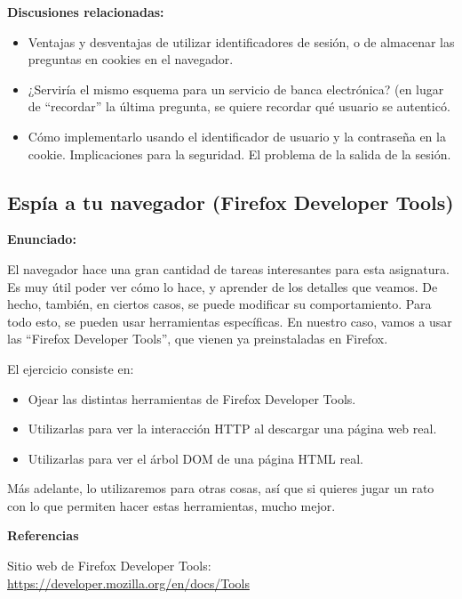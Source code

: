 \textbf{Discusiones relacionadas:}

\begin{itemize}
\item Ventajas y desventajas de utilizar identificadores de sesión, o de almacenar las preguntas en cookies en el navegador.
\item ¿Serviría el mismo esquema para un servicio de banca electrónica? (en lugar de ``recordar'' la última pregunta, se quiere recordar qué usuario se autenticó.
\item Cómo implementarlo usando el identificador de usuario y la contraseña en la cookie. Implicaciones para la seguridad. El problema de la salida de la sesión.
\end{itemize}

\subsection{Espía a tu navegador (Firefox Developer Tools)}
\label{subsec:firefox-devel}

\textbf{Enunciado:}

El navegador hace una gran cantidad de tareas interesantes para esta asignatura. Es muy útil poder ver cómo lo hace, y aprender de los detalles que veamos. De hecho, también, en ciertos casos, se puede modificar su comportamiento. Para todo esto, se pueden usar herramientas específicas. En nuestro caso, vamos a usar las ``Firefox Developer Tools'', que vienen ya preinstaladas en Firefox.

El ejercicio consiste en:

\begin{itemize}
\item Ojear las distintas herramientas de Firefox Developer Tools.
\item Utilizarlas para ver la interacción HTTP al descargar una página web real.
\item Utilizarlas para ver el árbol DOM de una página HTML real.
\end{itemize}

Más adelante, lo utilizaremos para otras cosas, así que si quieres jugar un rato con lo que permiten hacer estas herramientas, mucho mejor.

\textbf{Referencias}

Sitio web de Firefox Developer Tools: \\
\url{https://developer.mozilla.org/en/docs/Tools}



